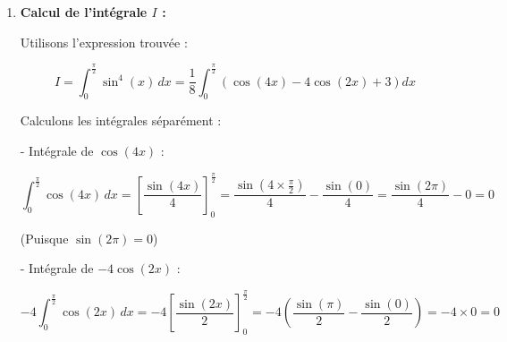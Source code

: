 \documentclass[a4paper,12pt]{article}
\begin{document}
\begin{solutionbox}
\begin{enumerate}
    \[
    \sin^4(x) = \dfrac{1}{(2i)^4} \left( e^{-i 4 x} - 4 e^{-i 2 x} + 6 - 4 e^{i 2 x} + e^{i 4 x} \right)
    \]

    Calculons \( (2i)^4 \) :

    \[
    (2i)^4 = 16 i^4 = 16 \times (i^2)^2 = 16 \times (-1)^2 = 16
    \]

    Ainsi :

    \[
    \sin^4(x) = \dfrac{1}{16} \left( e^{-i 4 x} - 4 e^{-i 2 x} + 6 - 4 e^{i 2 x} + e^{i 4 x} \right)
    \]

    Regroupons les termes conjugués :

    \[
    e^{-i 4 x} + e^{i 4 x} = 2 \cos(4 x)
    \]
    \[
    e^{-i 2 x} + e^{i 2 x} = 2 \cos(2 x)
    \]

    Donc :

    \[
    \sin^4(x) = \dfrac{1}{16} \left( 2 \cos(4 x) - 4 \times 2 \cos(2 x) + 6 \right ) = \dfrac{1}{16} \left( 2 \cos(4 x) - 8 \cos(2 x) + 6 \right )
    \]

    Simplifions :

    \[
    \sin^4(x) = \dfrac{1}{8} \left( \cos(4 x) - 4 \cos(2 x) + 3 \right )
    \]

    \textbf{Conclusion :} On a démontré que :

    \[
    \sin^4(x) = \dfrac{1}{8} \left( \cos(4 x) - 4 \cos(2 x) + 3 \right )
    \]

    \item \textbf{Calcul de l'intégrale \( I \) :}

    Utilisons l'expression trouvée :

    \[
    I = \int_0^{\frac{\pi}{2}} \sin^4(x) \, dx = \dfrac{1}{8} \int_0^{\frac{\pi}{2}} \left( \cos(4x) - 4\cos(2x) + 3 \right) dx
    \]

    Calculons les intégrales séparément :

    - Intégrale de \( \cos(4x) \) :

    \[
    \int_0^{\frac{\pi}{2}} \cos(4x) \, dx = \left[ \dfrac{\sin(4x)}{4} \right]_0^{\frac{\pi}{2}} = \dfrac{\sin(4 \times \frac{\pi}{2})}{4} - \dfrac{\sin(0)}{4} = \dfrac{\sin(2\pi)}{4} - 0 = 0
    \]

    (Puisque \( \sin(2\pi) = 0 \))

    - Intégrale de \( -4 \cos(2x) \) :

    \[
    -4 \int_0^{\frac{\pi}{2}} \cos(2x) \, dx = -4 \left[ \dfrac{\sin(2x)}{2} \right]_0^{\frac{\pi}{2}} = -4 \left( \dfrac{\sin(\pi)}{2} - \dfrac{\sin(0)}{2} \right ) = -4 \times 0 = 0
    \]


\end{enumerate}
\end{solutionbox}
\end{document}
